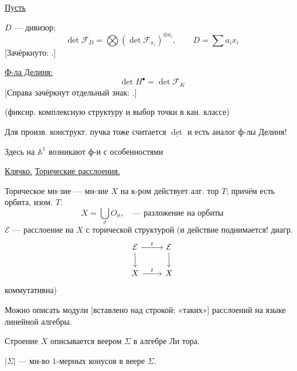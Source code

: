 \underline{Пусть}

$D$ — дивизор;
\begin{equation*}
\det\mathcal F_D=\bigotimes(\det\mathcal F_{x_i})^{\otimes a_i},
\qquad D=\sum a_i x_i \tag{3}
\end{equation*}
[Зачёркнуто:
.]

\underline{Ф-ла Делиня:}
\begin{equation*}
\det H^\bullet=\det\mathcal F_K \tag{4}
\end{equation*}
[Справа зачёркнут отдельный знак:
.]

(фиксир. комплексную структуру и выбор точки в кан. классе)

Для произв. конструкт. пучка тоже считается $\underline{\det}$ и
есть аналог ф-лы Делиня!

Здесь на $\mathbb A^1$ возникают ф-и с особенностями

\underline{\underline{Клячко.}}\quad
\underline{\underline{Торические расслоения.}}

Торическое мн-зие — мн-зие $X$ на к-ром действует алг. тор $T$;
причём есть орбита, изом. $T$.
\begin{equation*}
X=\bigcup_\sigma O_\sigma,\quad\text{— разложение на орбиты}
\end{equation*}
$\mathcal E$ — расслоение на $X$ с торической структурой
(и действие поднимается! диагр.
\begin{equation*}
\begin{tikzcd}
\mathcal E \arrow[r,"t"] \arrow[d] & \mathcal E \arrow[d] \\
X \arrow[r,"t"] & X
\end{tikzcd}
\end{equation*}
коммутативна)

Можно описать модули [вставлено над строкой: «таких»]
расслоений на языке линейной алгебры.


Строение $X$ описывается веером $\Sigma$ в алгебре Ли тора.
\begin{center}
\end{center}
$|\Sigma|$ — мн-во $1$-мерных конусов в веере $\Sigma$.

